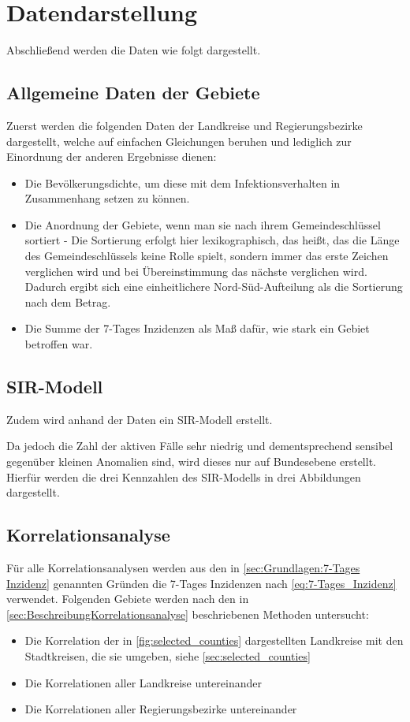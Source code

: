 \section{Datendarstellung}
Abschließend werden die Daten wie folgt dargestellt.
\subsection{Allgemeine Daten der Gebiete}
Zuerst werden die folgenden Daten der Landkreise und Regierungsbezirke dargestellt, welche auf einfachen Gleichungen beruhen und lediglich zur Einordnung der anderen Ergebnisse dienen:
\begin{itemize}
    \item Die Bevölkerungsdichte, um diese mit dem Infektionsverhalten in Zusammenhang setzen zu können.
    \item Die Anordnung der Gebiete, wenn man sie nach ihrem Gemeindeschlüssel sortiert - Die Sortierung erfolgt hier lexikographisch, das heißt, das die Länge des Gemeindeschlüssels keine Rolle spielt, sondern immer das erste Zeichen verglichen wird und bei Übereinstimmung das nächste verglichen wird. Dadurch ergibt sich eine einheitlichere Nord-Süd-Aufteilung als die Sortierung nach dem Betrag.
    \item Die Summe der 7-Tages Inzidenzen als Maß dafür, wie stark ein Gebiet betroffen war.
\end{itemize}
\subsection{SIR-Modell}
Zudem wird anhand der Daten ein SIR-Modell erstellt.


Da jedoch die Zahl der aktiven Fälle sehr niedrig und dementsprechend sensibel gegenüber kleinen Anomalien sind, wird dieses nur auf Bundesebene erstellt. 
Hierfür werden die drei Kennzahlen des SIR-Modells in drei Abbildungen dargestellt.
\subsection{Korrelationsanalyse}
Für alle Korrelationsanalysen werden aus den in \autoref{sec:Grundlagen:7-Tages Inzidenz} genannten Gründen die 7-Tages Inzidenzen nach \autoref{eq:7-Tages_Inzidenz} verwendet. Folgenden Gebiete werden nach den in \autoref{sec:BeschreibungKorrelationsanalyse} beschriebenen Methoden untersucht:
\begin{itemize}
    \item Die Korrelation der in \autoref{fig:selected_counties} dargestellten Landkreise mit den Stadtkreisen, die sie umgeben, siehe \autoref{sec:selected_counties}
    \item Die Korrelationen aller Landkreise untereinander
    \item Die Korrelationen aller Regierungsbezirke untereinander
\end{itemize}

